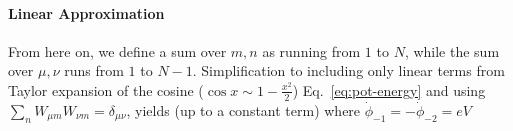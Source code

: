 \documentclass[%
reprint,
superscriptaddress,
 amsmath,amssymb,
 aps,
 prx,
longbibliography,
floatfix,
]{revtex4-2}
\begin{document}
\paragraph{Linear Approximation}
From here on, we define a sum over $m,n$ as running from $1$ to $N$, while the sum over $\mu,\nu$ runs from $1$ to $N-1$. Simplification to including only linear terms from Taylor expansion of the cosine ($\cos{x}\sim 1-\frac{x^2}{2}$) Eq.~\ref{eq:pot-energy} and using $\sum_{n}W_{\mu m}W_{\nu m}=\delta_{\mu\nu}$, yields (up to a constant term)
where $\dot{\phi}_{-1}=-\dot{\phi}_{-2}=eV$
\end{document}
